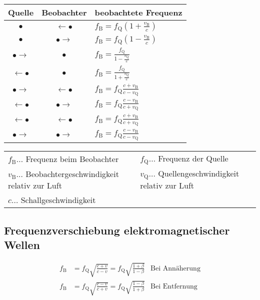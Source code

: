 			\begin{table}[here]
			\begin{tabular}{ccl}
				Quelle & Beobachter & beobachtete Frequenz\\
				\toprule
				$\bullet$ & $\leftarrow \bullet$ & $f_{\mathrm{B}}=f_{\mathrm{Q}}\left(1+\frac{v_{\mathrm{B}}}{c}\right)$\\
				\midrule
				$\bullet$ & $\bullet \rightarrow$ & $f_{\mathrm{B}}=f_{\mathrm{Q}}\left(1-\frac{v_{\mathrm{B}}}{c}\right)$\\
				\midrule
				$\bullet \rightarrow$ & $\bullet$ & $f_{\mathrm{B}}=\frac{f_{\mathrm{Q}}}{1-\frac{v_{\mathrm{Q}}}{c}}$\\
				\midrule
				$\leftarrow \bullet$ & $\bullet$ & $f_{\mathrm{B}}=\frac{f_{\mathrm{Q}}}{1+\frac{v_{\mathrm{Q}}}{c}}$\\
				\midrule
				$\bullet \rightarrow$ & $\leftarrow \bullet$ & $f_{\mathrm{B}}=f_{\mathrm{Q}}\frac{c+v_{\mathrm{B}}}{c-v_{\mathrm{Q}}}$\\
				\midrule
				$\leftarrow \bullet$ & $\bullet \rightarrow$ & $f_{\mathrm{B}}=f_{\mathrm{Q}}\frac{c-v_{\mathrm{B}}}{c+v_{\mathrm{Q}}}$\\
				\midrule
				$\leftarrow \bullet$ & $\leftarrow \bullet$ & $f_{\mathrm{B}}=f_{\mathrm{Q}}\frac{c+v_{\mathrm{B}}}{c+v_{\mathrm{Q}}}$\\
				\midrule
				$\bullet \rightarrow$ & $\bullet \rightarrow$ & $f_{\mathrm{B}}=f_{\mathrm{Q}}\frac{c-v_{\mathrm{B}}}{c-v_{\mathrm{Q}}}$\\
				\bottomrule
			\end{tabular}
			\end{table}


			\begin{table}[h]
			\begin{tabular}{ll}
			$f_{\mathrm{B}}\dots$ Frequenz beim Beobachter & $f_{\mathrm{Q}}\dots$ Frequenz der Quelle\\
			$v_{\mathrm{B}}\dots$ Beobachtergeschwindigkeit relativ zur Luft & $v_{\mathrm{Q}}\dots$ Quellengeschwindigkeit relativ zur Luft\\
			$c\dots$ Schallgeschwindigkeit\\
			\end{tabular}
			\end{table}

		\subsection{Frequenzverschiebung elektromagnetischer Wellen}
			\begin{align*}
				f_{\mathrm{B}} &= f_{\mathrm{Q}}\sqrt{\frac{c+v}{c-v}}= f_{\mathrm{Q}}\sqrt{\frac{1+\beta}{1-\beta}} & \text{Bei Annäherung}\\
				f_{\mathrm{B}} &= f_{\mathrm{Q}}\sqrt{\frac{c-v}{c+v}}= f_{\mathrm{Q}}\sqrt{\frac{1-\beta}{1+\beta}} & \text{Bei Entfernung}
			\end{align*}

